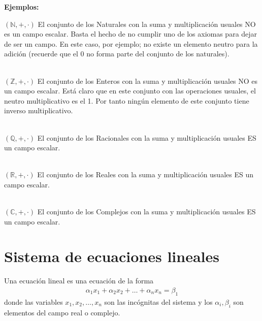 \textbf{Ejemplos:}



$\left( \mathbb{N},+ ,\cdot \right) $
El conjunto de los Naturales con la suma y multiplicación usuales NO es un campo escalar.
Basta el hecho de no cumplir uno de los axiomas para dejar de ser un campo. En este caso, por ejemplo; no existe un elemento neutro para la adición (recuerde que el 0 no forma parte del conjunto de los naturales).

~\\
$\left( \mathbb{Z},+ ,\cdot \right) $ 
El conjunto de los Enteros con la suma y multiplicación usuales NO es un campo escalar.
Está claro que en este conjunto con las operaciones usuales, el neutro multiplicativo es el 1. Por tanto ningún elemento de este conjunto tiene inverso multiplicativo.

~\\
$\left( \mathbb{Q},+ ,\cdot \right) $ 
El conjunto de los Racionales con la suma y multiplicación usuales ES un campo escalar.

~\\
$\left( \mathbb{R},+ ,\cdot \right) $ 
El conjunto de los Reales con la suma y multiplicación usuales ES un campo escalar.

~\\
$\left( \mathbb{C},+ ,\cdot \right) $ 
El conjunto de los Complejos con la suma y multiplicación usuales ES un campo escalar.


\section{Sistema de ecuaciones lineales}

Una ecuación lineal es una ecuación de la forma
\begin{align*}
\alpha_1 x_1+\alpha_2 x_2+\hdots+\alpha_n x_n=\beta_1
\end{align*} 
donde las variables $x_1, x_2, \hdots, x_n$ son las incógnitas del sistema y los $\alpha_i, \beta_i$ son elementos del campo real o complejo.

